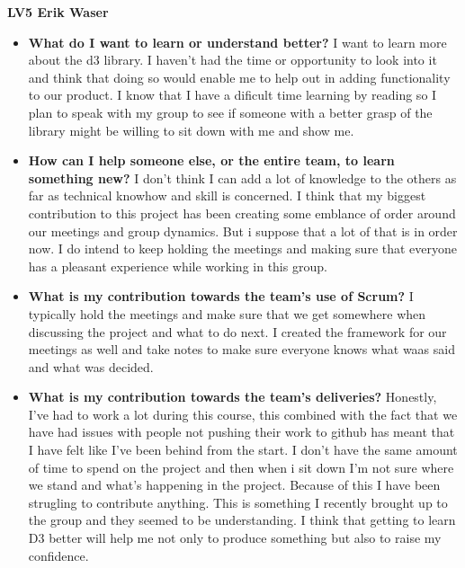 \documentclass[]{article}
\begin{document}
\textbf{\huge{LV5} Erik Waser}

\begin{itemize}
    \item \textbf{What do I want to learn or understand better?} \newline
    I want to learn more about the d3 library. I haven't had the time or opportunity to look into it and think that doing so would enable me to help out in adding functionality to our product. 
    I know that I have a dificult time learning by reading so I plan to speak with my group to see if someone with a better grasp of the library might be willing to sit down with me and show me. 
    
    
    \item \textbf{How can I help someone else, or the entire team, to learn something new?} \newline
    I don't think I can add a lot of knowledge to the others as far as technical knowhow and skill is concerned. I think that my biggest contribution to this project has been creating some emblance of order around our meetings and group dynamics. But i suppose that a lot of that is in order now. I do intend to keep holding the meetings and making sure that everyone has a pleasant experience while working in this group. 
    
    \item \textbf{What is my contribution towards the team’s use of Scrum?} \newline
    I typically hold the meetings and make sure that we get somewhere when discussing the project and what to do next. I created the framework for our meetings as well and take notes to make sure everyone knows what waas said and what was decided.
    
    \item \textbf{What is my contribution towards the team’s deliveries?} \newline
    Honestly, I've had to work a lot during this course, this combined with the fact that we have had issues with people not pushing their work to github has meant that I have felt like I've been behind from the start. I don't have the same amount of time to spend on the project and then when i sit down I'm not sure where we stand and what's happening in the project. Because of this I have been strugling to contribute anything. This is something I recently brought up to the group and they seemed to be understanding. I think that getting to learn D3 better will help me not only to produce something but also to raise my confidence.
    
 
\end{itemize}
\end{document}
